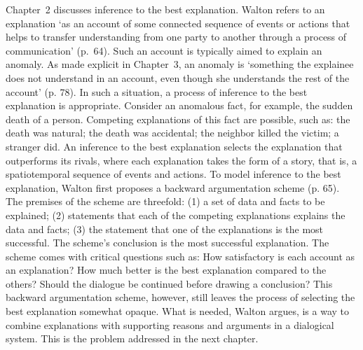 \documentclass[12pt]{article}
\begin{document}
Chapter~2 discusses inference to the best explanation. Walton refers to an explanation 
`as an account of some connected sequence of events or actions that helps to transfer understanding 
from one party to another through a process of communication' (p.\ 64). 
Such an account is typically aimed to explain an anomaly. 
As made explicit in Chapter~3, an anomaly is 
`something the explainee does not understand in an account, 
even though she understands the rest of the account' (p. 78). In such a situation, 
a process of inference to the best explanation is appropriate. Consider an
anomalous fact, for example, the sudden death of a person. Competing
explanations of this fact are possible, such as: the death was natural; the death was
accidental; the neighbor killed the victim; a stranger did. An inference to the best explanation selects the
explanation that outperforms its rivals, where each explanation takes
the form of a story, that is, a spatiotemporal sequence of events and actions.
To model inference to the best explanation, Walton first proposes 
a backward argumentation scheme (p. 65). The premises of the scheme are threefold: (1) 
a set of data and facts to be explained; (2) statements that each of the competing explanations explains 
the data and facts; (3) the statement that one of the explanations is the most successful. 
The scheme's conclusion is the most successful explanation. The scheme comes with critical questions such as: How satisfactory is each account as an explanation? How much better is the best explanation compared to the others? Should the dialogue be continued before drawing a conclusion?   
This backward argumentation scheme, however, still leaves the process of selecting the best explanation somewhat opaque. 
What is needed, Walton argues, is a way to combine explanations with supporting 
reasons and arguments in a dialogical system. This
is the problem addressed in the next chapter.
\end{document}
